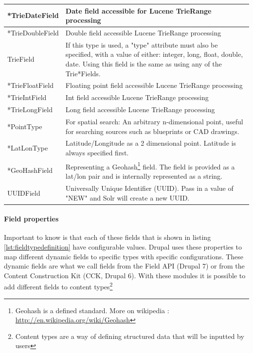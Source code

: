 \begin{longtable}{| p{4cm} | p{11cm} |}
    *TrieDateField & Date field accessible for Lucene TrieRange processing \\ \hline
    *TrieDoubleField & Double field accessible Lucene TrieRange processing \\ \hline
    TrieField & If this type is used, a "type" attribute must also be specified, with a value of either: integer, long, float, double, date. Using this field is the same as using any of the Trie*Fields. \\ \hline
    *TrieFloatField & Floating point field accessible Lucene TrieRange processing \\ \hline
    *TrieIntField & Int field accessible Lucene TrieRange processing \\ \hline
    *TrieLongField & Long field accessible Lucene TrieRange processing \\ \hline
    *PointType & For spatial search: An arbitrary n-dimensional point, useful for searching sources such as blueprints or CAD drawings. \\ \hline
    *LatLonType &  Latitude/Longitude as a 2 dimensional point. Latitude is always specified first.\\ \hline
    *GeoHashField & Representing a Geohash\footnote{Geohash is a defined standard. More on wikipedia : \url{http://en.wikipedia.org/wiki/Geohash}} field. The field is provided as a lat/lon pair and is internally represented as a string.\\ \hline
    UUIDField & Universally Unique Identifier (UUID). Pass in a value of "NEW" and Solr will create a new UUID. \\ 
     \hline
\end{longtable}

\paragraph{Field properties}
Important to know is that each of these fields that is shown in listing \ref{lst:fieldtypedefinition} have configurable values. Drupal uses these properties to map different dynamic fields to specific types with specific configurations. 
These dynamic fields are what we call fields from the Field API (Drupal 7) or from the Content Construction Kit (CCK, Drupal 6). With these modules it is possible to add different fields to content types\footnote{Content types are a way of defining structured data that will be inputted by users}

